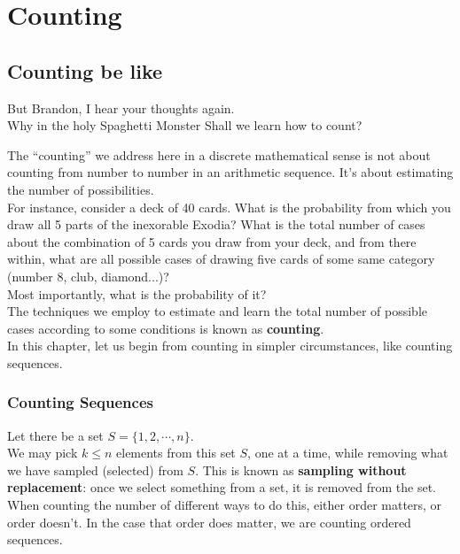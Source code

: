 \chapter{Counting}

\section{Counting be like}
But Brandon, I hear your thoughts again. \\
Why in the holy Spaghetti Monster Shall we learn how to count?

The ``counting'' we address here in a discrete mathematical sense is not about counting from number to number in an arithmetic sequence. It's about estimating the number of possibilities. \\
For instance, consider a deck of 40 cards. What is the probability from which you draw all 5 parts of the inexorable Exodia? What is the total number of cases about the combination of 5 cards you draw from your deck, and from there within, what are all possible cases of drawing five cards of some same category (number 8, club, diamond...)? \\
Most importantly, what is the probability of it? \\
The techniques we employ to estimate and learn the total number of possible cases according to some conditions is known as \textbf{counting}. \\
In this chapter, let us begin from counting in simpler circumstances, like counting sequences.

\subsection{Counting Sequences}
Let there be a set $S = \{1, 2, \cdots, n\}$. \\
We may pick $k \leq n$ elements from this set $S$, one at a time, while removing what we have sampled (selected) from $S$. This is known as \textbf{sampling without replacement}: once we select something from a set, it is removed from the set. \\
When counting the number of different ways to do this, either order matters, or order doesn't. In the case that order does matter, we are counting ordered sequences.

